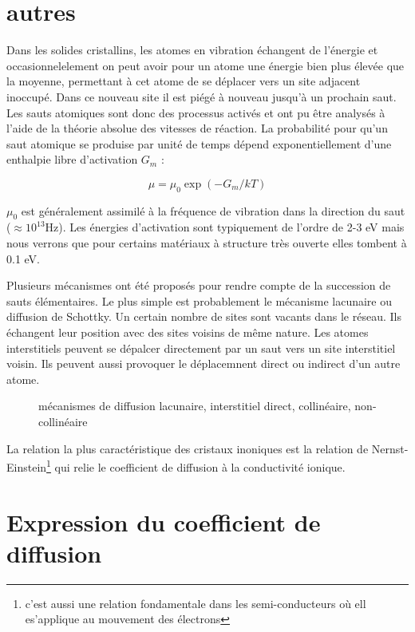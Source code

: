 \section{autres}

Dans les solides cristallins, les atomes en vibration échangent de l'énergie et occasionnelelement on peut avoir pour un atome une énergie bien plus élevée que la moyenne, permettant à cet atome de se déplacer vers un site adjacent inoccupé. Dans ce nouveau site il est piégé à nouveau jusqu'à un prochain saut. Les sauts atomiques sont donc des processus activés et ont pu être analysés à l'aide de la théorie absolue des vitesses de réaction. La probabilité pour qu'un saut atomique se produise par unité de temps dépend exponentiellement d'une enthalpie libre d'activation $G_m$ :

\begin{equation}
\mu = \mu_0 \exp (-G_m / kT)
\end{equation}

$\mu_0$ est généralement assimilé à la fréquence de vibration dans la direction du saut ($\approx 10^{13}$Hz). Les énergies d'activation sont typiquement de l'ordre de 2-3 eV mais nous verrons que pour certains matériaux à structure très ouverte elles tombent à 0.1 eV.

Plusieurs mécanismes ont été proposés pour rendre compte de la succession de sauts élémentaires. Le plus simple est probablement le mécanisme lacunaire ou diffusion de Schottky. Un certain nombre de sites sont vacants dans le réseau. Ils échangent leur position avec des sites voisins de même nature. Les atomes interstitiels peuvent se dépalcer directement par un saut vers un site interstitiel voisin. Ils peuvent aussi provoquer le déplacemnent direct ou indirect d'un autre atome.

\begin{figure}
\TODO
\caption{mécanismes de diffusion lacunaire, interstitiel direct, collinéaire, non-collinéaire}
\label{mecanismestransport}
\end{figure}

La relation la plus caractéristique des cristaux inoniques est la relation de Nernst-Einstein\footnote{c'est aussi une relation fondamentale dans les semi-conducteurs où ell es'applique au mouvement des électrons} qui relie le coefficient de diffusion à la conductivité ionique.

\section{Expression du coefficient de diffusion}


